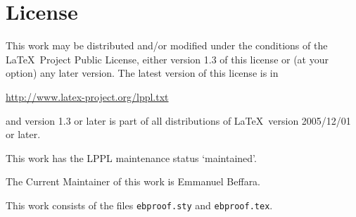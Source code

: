 \documentclass{article}
\begin{document}
\section{License}

This work may be distributed and/or modified under the
conditions of the \LaTeX\ Project Public License, either version 1.3
of this license or (at your option) any later version.
The latest version of this license is in
\begin{center}
  \url{http://www.latex-project.org/lppl.txt}
\end{center}
and version 1.3 or later is part of all distributions of \LaTeX\
version 2005/12/01 or later.

This work has the LPPL maintenance status `maintained'.

The Current Maintainer of this work is Emmanuel Beffara.

This work consists of the files \texttt{ebproof.sty} and \texttt{ebproof.tex}.
\end{document}
